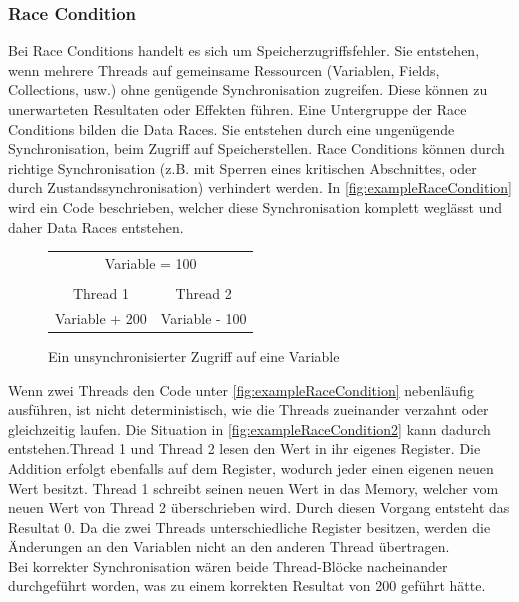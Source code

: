 \documentclass[10pt,a4paper]{article}
\begin{document}
\subsubsection{Race Condition}\label{race_conditons}
Bei Race Conditions handelt es sich um Speicherzugriffsfehler. Sie entstehen, wenn mehrere Threads auf gemeinsame Ressourcen (Variablen, Fields, Collections, usw.) ohne genügende Synchronisation zugreifen. Diese können zu unerwarteten Resultaten oder Effekten führen. Eine Untergruppe der Race Conditions bilden die Data Races. Sie entstehen durch eine ungenügende Synchronisation, beim Zugriff auf Speicherstellen.
Race Conditions können durch richtige Synchronisation (z.B. mit Sperren eines kritischen Abschnittes, oder durch Zustandssynchronisation) verhindert werden. In \autoref{fig:exampleRaceCondition} wird ein Code beschrieben, welcher diese Synchronisation komplett weglässt und daher Data Races entstehen.\\
\begin{figure}[H]
\centering
\begin{tabular}{|cc|}
\hline
\multicolumn{2}{|c|}{Variable = 100} \\ 
 &  \\ 
Thread 1 & Thread 2 \\ 
Variable + 200 & Variable - 100 \\ 
\hline
\end{tabular}
\caption[Beispiel Race Condition]{Ein unsynchronisierter Zugriff auf eine Variable}
\label{fig:exampleRaceCondition}
\end{figure}
\newpage
Wenn zwei Threads den Code unter \autoref{fig:exampleRaceCondition} nebenläufig ausführen, ist nicht deterministisch, wie die Threads zueinander verzahnt oder gleichzeitig laufen. Die Situation in \autoref{fig:exampleRaceCondition2} kann dadurch entstehen.Thread 1 und Thread 2 lesen den Wert in ihr eigenes Register. Die Addition erfolgt ebenfalls auf dem Register, wodurch jeder einen eigenen neuen Wert besitzt. Thread 1 schreibt seinen neuen Wert in das Memory, welcher vom neuen Wert von Thread 2 überschrieben wird. Durch diesen Vorgang entsteht das Resultat 0. Da die zwei Threads unterschiedliche Register besitzen, werden die Änderungen an den Variablen nicht an den anderen Thread übertragen.\\
Bei korrekter Synchronisation wären beide Thread-Blöcke nacheinander durchgeführt worden, was zu einem korrekten Resultat von 200 geführt hätte.\\
\end{document}
